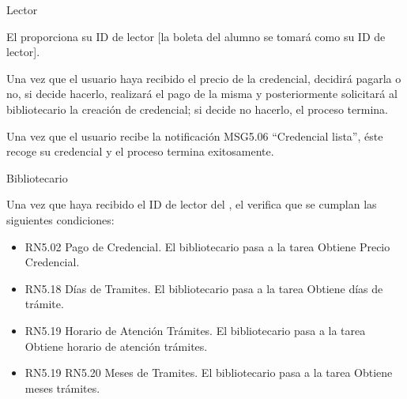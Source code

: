 \begin{PDescripcion}

  \Ppaso Lector

    \begin{enumerate}

      \Ppaso[\itarea]   El  proporciona su ID de lector [la boleta del alumno se tomará como su ID
      de lector].

      \Ppaso[\itarea]  Una vez que el usuario haya recibido el precio de la
      credencial, decidirá pagarla o no, si decide hacerlo, realizará el pago de la misma y posteriormente solicitará al bibliotecario la creación de credencial; si decide no hacerlo, el proceso termina.

      \Ppaso[\itarea]  Una vez que el usuario recibe la notificación MSG5.06 “Credencial lista”, éste recoge su credencial y el proceso termina exitosamente.

    \end{enumerate}

  \Ppaso Bibliotecario

    \begin{enumerate}

      \Ppaso[\itarea]  Una vez que haya recibido el ID de lector del , el  verifica que se cumplan las siguientes condiciones:

      \begin{itemize}
        \item RN5.02 Pago de Credencial. El bibliotecario pasa a la tarea Obtiene Precio Credencial.
        \item RN5.18 Días de Tramites. El bibliotecario pasa a la tarea Obtiene días de trámite.
        \item RN5.19 Horario de Atención Trámites. El bibliotecario pasa a la tarea Obtiene horario de atención trámites.
        \item RN5.19 RN5.20 Meses de Tramites. El bibliotecario pasa a la tarea Obtiene meses trámites.
      \end{itemize}
      

\end{enumerate}
\end{PDescripcion}
